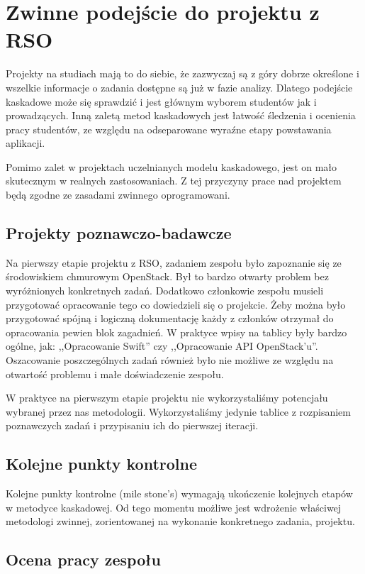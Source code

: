 \section{Zwinne podejście do projektu z RSO}

Projekty na studiach mają to do siebie, że zazwyczaj są z góry dobrze określone i wszelkie informacje o zadania dostępne są już w fazie analizy. Dlatego podejście kaskadowe może się sprawdzić i jest głównym wyborem studentów jak i prowadzących. Inną zaletą metod kaskadowych jest łatwość śledzenia i ocenienia pracy studentów, ze względu na odseparowane wyraźne etapy powstawania aplikacji.


Pomimo zalet w projektach uczelnianych modelu kaskadowego, jest on mało skutecznym w realnych zastosowaniach. Z tej przyczyny prace nad projektem będą zgodne ze zasadami zwinnego oprogramowani.

\subsection{Projekty poznawczo-badawcze}

Na pierwszy etapie projektu z RSO, zadaniem zespołu było zapoznanie się ze środowiskiem chmurowym OpenStack. Był to bardzo otwarty problem bez wyróżnionych konkretnych zadań. Dodatkowo członkowie zespołu musieli przygotować opracowanie tego co dowiedzieli się o projekcie. Żeby można było przygotować spójną i logiczną dokumentację każdy z członków otrzymał do opracowania pewien blok zagadnień. W praktyce wpisy na tablicy były bardzo ogólne, jak: ,,Opracowanie Swift'' czy ,,Opracowanie API OpenStack'u''. Oszacowanie poszczególnych zadań również było nie możliwe ze względu na otwartość problemu i małe doświadczenie zespołu. 

W praktyce na pierwszym etapie projektu nie wykorzystaliśmy potencjału wybranej przez nas metodologii. Wykorzystaliśmy jedynie tablice z rozpisaniem poznawczych zadań i przypisaniu ich do pierwszej iteracji.

\subsection{Kolejne punkty kontrolne}

Kolejne punkty kontrolne (mile stone's) wymagają ukończenie kolejnych etapów w metodyce kaskadowej. Od tego momentu możliwe jest wdrożenie właściwej metodologi zwinnej, zorientowanej na wykonanie konkretnego zadania, projektu.

\subsection{Ocena pracy zespołu}

